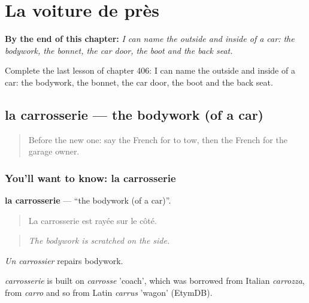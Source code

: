 
\chapter{La voiture de près}
\label{ch:fr-la-voiture-de-pres}

\begin{chapteropening}
\textbf{By the end of this chapter:} \emph{I can name the outside and inside of a car: the bodywork, the bonnet, the car door, the boot and the back seat.}

Complete the last lesson of chapter 406: I can name the outside and inside of a car: the bodywork, the bonnet, the car door, the boot and the back seat.
\end{chapteropening}

\section[la carrosserie]{la carrosserie — the bodywork (of a car)}

\label{lesson:FR-C406-carrosserie}



\begin{quote}
Before the new one: say the French for to tow, then the French for the garage owner.
\end{quote}

\subsection*{You'll want to know: la carrosserie}
\textbf{la carrosserie} — \textquotedblleft{}the bodywork (of a car)\textquotedblright{}.

\begin{quote}
La carrosserie est rayée sur le côté.
\end{quote}

\begin{quote}
\emph{The bodywork is scratched on the side.}
\end{quote}

\emph{Un carrossier} repairs bodywork.

\begin{cousinweb}
\emph{carrosserie} is built on \emph{carrosse} 'coach', which was borrowed from Italian \emph{carrozza}, from \emph{carro} and so from Latin \emph{carrus} 'wagon' (EtymDB).
\end{cousinweb}

